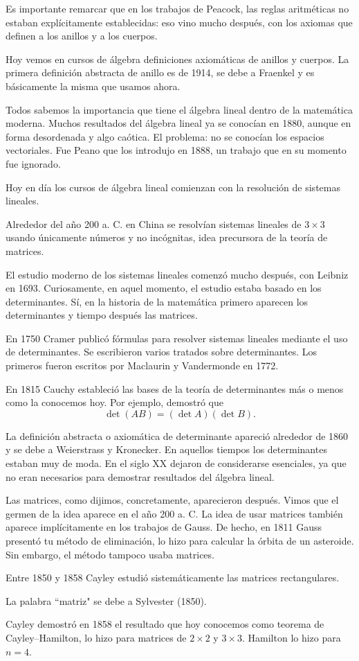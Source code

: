 Es importante remarcar que en los trabajos de Peacock, las reglas aritméticas
no estaban explícitamente establecidas: eso vino mucho después, con los axiomas
que definen a los anillos y a los cuerpos.  

Hoy vemos en cursos de álgebra definiciones axiomáticas de anillos
y cuerpos. La primera definición abstracta de anillo 
es de 1914, se debe a Fraenkel y es básicamente la misma que usamos
ahora. 

Todos sabemos la importancia que tiene el álgebra lineal 
dentro de la matemática moderna. Muchos resultados del álgebra
lineal ya se conocían en 1880, aunque en forma desordenada y algo caótica. 
El problema: no se conocían los espacios vectoriales. Fue Peano
que los introdujo en 1888, un trabajo que en su momento 
fue ignorado. 

Hoy en día los cursos de álgebra lineal comienzan con la resolución de sistemas lineales. 

Alrededor del año 200 a. C. en China se resolvían sistemas lineales de $3\times 3$ 
usando únicamente números y no incógnitas, idea precursora de la teoría de matrices. 

El estudio
moderno de los sistemas lineales comenzó mucho después, con Leibniz en 1693. Curiosamente,
en aquel momento, el estudio estaba basado en los determinantes. Sí, en la historia de la matemática primero aparecen  
los determinantes y tiempo después las matrices. 

En 1750 Cramer publicó fórmulas
para resolver sistemas lineales mediante el uso de determinantes. Se escribieron varios tratados sobre determinantes. Los primeros fueron escritos por Maclaurin y Vandermonde en 1772. 

En 1815 Cauchy  
estableció las bases de la teoría de determinantes más o menos como la conocemos hoy. Por ejemplo, demostró que 
\[
\det(AB)=(\det A)(\det B).
\]

La definición abstracta o axiomática de determinante apareció alrededor de 1860 y 
se debe a Weierstrass 
y Kronecker. En aquellos tiempos los determinantes estaban muy de moda. En el siglo XX 
dejaron de considerarse esenciales, ya que no eran necesarios para demostrar
resultados del álgebra lineal. 

Las matrices, como dijimos, concretamente, aparecieron después. Vimos que el germen 
de la idea aparece en el año 200 a. C. La idea de usar matrices también aparece implícitamente en los trabajos de Gauss. De hecho, en 1811 Gauss presentó tu método de eliminación, 
lo hizo para calcular la órbita de un asteroide. Sin embargo, el método
tampoco usaba matrices. 

Entre 1850 y 1858 Cayley estudió sistemáticamente las
matrices rectangulares. 

La palabra ``matriz" se debe a Sylvester (1850). 

Cayley 
demostró en 1858 el resultado que hoy conocemos como teorema de Cayley--Hamilton, lo hizo 
para matrices de $2\times 2$ y $3\times 3$. 
Hamilton lo hizo para $n=4$.

